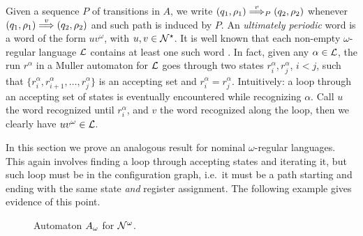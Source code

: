 %
%
{
Given a sequence $P$ of transitions in $A$, we write $(q_1,\rho_1) \overset{v}{\Longrightarrow}_{P} (q_2,\rho_2)$ whenever $(q_1,\rho_1) \overset{v}{\Longrightarrow} (q_2,\rho_2)$ and such path is induced by $P$.
}
%
An \emph{ultimately periodic} word is a word of the form $uv^\omega$, with $u,v \in \mathcal{N}^\star$.  It is well known that each non-empty $\omega$-regular language $\mathcal{L}$ contains at least one such word \cite{CalbrixNP93}. In fact, given any $\alpha \in \mathcal{L}$, the run $r^\alpha$ in a Muller automaton for $\mathcal{L}$ goes through two states $r^\alpha_i,r^\alpha_j$, $i<j$, such that $\{r^\alpha_i,r^\alpha_{i+1},\dots,r^\alpha_j\}$ is an accepting set and $r^\alpha_i = r^\alpha_j$. Intuitively: a loop through an accepting set of states is eventually encountered while recognizing $\alpha$. Call $u$ the word recognized until $r^\alpha_i$, and $v$ the word recognized along the loop, then we clearly have $uv^\omega \in \mathcal{L}$.

In this section we prove an analogous result for nominal $\omega$-regular languages. This again involves finding a loop through accepting states and iterating it, but such loop must be in the configuration graph, i.e.\ it must be a path starting and ending with the same state \emph{and} register assignment. The following example gives evidence of this point.
%



\begin{figure}[t]
\begin{center}

\end{center}
\caption{Automaton $A_\omega$ for $\mathcal{N}^\omega$.}
\label{fig:nomega-automaton}
\end{figure}

